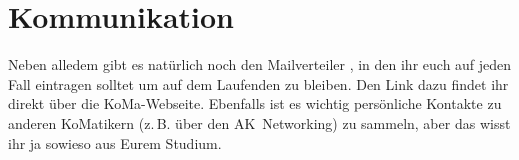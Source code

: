 \chapter{Kommunikation}

Neben alledem gibt es natürlich noch den Mailverteiler
, in den ihr euch auf jeden Fall eintragen solltet um
auf dem Laufenden zu bleiben. Den Link dazu findet ihr direkt über die
KoMa-Webseite. Ebenfalls ist es wichtig persönliche Kontakte zu anderen
KoMatikern (z.\,B. über den AK~Networking) zu sammeln, aber das wisst ihr ja
sowieso aus Eurem Studium.
